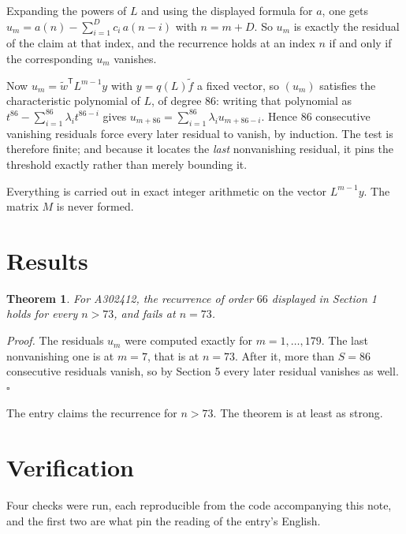 \documentclass[11pt]{article}
\newtheorem{theorem}{Theorem}
\theoremstyle{definition}
\begin{document}
Expanding the powers of $L$ and using the displayed formula for $a$, one gets $u_m = a(n) - \sum_{i=1}^{D} c_i\,a(n-i)$ with $n = m + D$. So $u_m$ is exactly the residual of the claim at that index, and the recurrence holds at an index $n$ if and only if the corresponding $u_m$ vanishes.

Now $u_m = \tilde w^{\mathsf T} L^{m-1} y$ with $y = q(L)\tilde f$ a fixed vector, so $(u_m)$ satisfies the characteristic polynomial of $L$, of degree $86$: writing that polynomial as $t^{86} - \sum_{i=1}^{86} \lambda_i t^{86-i}$ gives $u_{m+86} = \sum_{i=1}^{86} \lambda_i u_{m+86-i}$. Hence $86$ consecutive vanishing residuals force every later residual to vanish, by induction. The test is therefore finite; and because it locates the {\itshape last} nonvanishing residual, it pins the threshold exactly rather than merely bounding it.

Everything is carried out in exact integer arithmetic on the vector $L^{m-1}y$. The matrix $M$ is never formed.

\section{Results}

\begin{theorem} For A302412, the recurrence of order $66$ displayed in Section 1 holds for every $n > 73$, and fails at $n = 73$.\end{theorem}

{\itshape Proof.} The residuals $u_m$ were computed exactly for $m = 1,\dots,179$. The last nonvanishing one is at $m = 7$, that is at $n = 73$. After it, more than $S = 86$ consecutive residuals vanish, so by Section 5 every later residual vanishes as well. $\square$

The entry claims the recurrence for $n > 73$. The theorem is at least as strong.

\section{Verification}

Four checks were run, each reproducible from the code accompanying this note, and the first two are what pin the reading of the entry's English.
\end{document}
